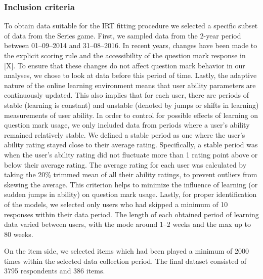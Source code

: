\documentclass[11pt]{article}
\begin{document}
\subsubsection{Inclusion criteria}
To obtain data suitable for the IRT fitting procedure we selected a specific subset of data from the Series game. First, we sampled data from the 2-year period between 01--09--2014 and 31--08--2016. In recent years, changes have been made to the explicit scoring rule and the accessibility of the question mark response in [X]. To ensure that these changes do not affect question mark behavior in our analyses, we chose to look at data before this period of time. Lastly, the adaptive nature of the online learning environment means that user ability parameters are continuously updated. This also implies that for each user, there are periods of stable (learning is constant) and unstable (denoted by jumps or shifts in learning) measurements of user ability. In order to control for possible effects of learning on question mark usage, we only included data from periods where a user's ability remained relatively stable. We defined a stable period as one where the user's ability rating stayed close to their average rating. Specifically, a stable period was when the user's ability rating did not fluctuate more than 1 rating point above or below their average rating. The average rating for each user was calculated by taking the 20\% trimmed mean of all their ability ratings, to prevent outliers from skewing the average. This criterion helps to minimize the influence of learning (or sudden jumps in ability) on question mark usage. Lastly, for proper identification of the models, we selected only users who had skipped a minimum of 10 responses within their data period. The length of each obtained period of learning data varied between users, with the mode around 1--2 weeks and the max up to 80 weeks.

On the item side, we selected items which had been played a minimum of \num{2000} times within the selected data collection period. The final dataset consisted of \num{3795} respondents and \num{386} items. 
\end{document}
